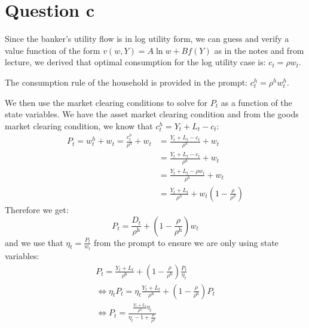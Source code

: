 \documentclass{article}
\begin{document}
\section*{Question c}
Since the banker's utility flow is in log utility form, we can guess and verify a value function of the form $v(w, Y)=A \ln w+B f(Y)$ as in the notes and from lecture, we derived that optimal consumption for the log utility case is: $\boxed{c_{t}=\rho w_{t}}$.

The consumption rule of the household is provided in the prompt: $\boxed{c_t^h = \rho^h w^h_t}$.

We then use the market clearing conditions to solve for $P_t$ as a function of the state variables. We have the asset market clearing condition and from the goods market clearing condition, we know that $c_t^h = Y_t + L_t - c_t$:
\[
\begin{aligned}
    P_t = w_t^h + w_t = \frac{c_t^h}{\rho^h} + w_t &= \frac{Y_t + L_t - c_t}{\rho^h} + w_t\\
    &= \frac{Y_t + L_t - c_t}{\rho^h} + w_t\\
    &= \frac{Y_t + L_t - \rho w_t}{\rho^h} + w_t\\
    &= \frac{Y_t + L_t}{\rho^h} + w_t\left(1 - \frac{\rho}{\rho^h}\right)
\end{aligned}
\]
Therefore we get:
\[
P_{t}=\frac{D_{t}}{\rho^{\mathrm{h}}}+\left(1-\frac{\rho}{\rho^{\mathrm{h}}}\right) w_{t}
\]
and we use that $\eta_t = \frac{P_t}{w_t}$ from the prompt to ensure we are only using state variables:
\[
\begin{aligned}
    P_{t}=\frac{Y_{t} + L_t}{\rho^{\mathrm{h}}}+\left(1-\frac{\rho}{\rho^{\mathrm{h}}}\right) \frac{P_t}{\eta_t}\\
    \iff \eta_t P_t = \eta_t \frac{Y_{t} + L_t}{\rho^{\mathrm{h}}}+\left(1-\frac{\rho}{\rho^{\mathrm{h}}}\right) P_t\\
    \iff \boxed{P_t = \frac{\frac{Y_{t} + L_t}{\rho^{\mathrm{h}}}\eta_t}{\eta_t - 1 + \frac{\rho}{\rho^h}}}
\end{aligned}
\]
\end{document}
